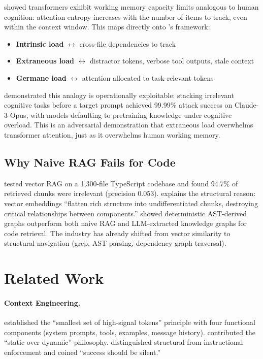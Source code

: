 \documentclass[11pt, a4paper, logo, copyright]{googledeepmind}
\begin{document}
\citet{kim2024working} showed transformers exhibit working memory capacity limits analogous to human cognition: attention entropy increases with the number of items to track, even within the context window. This maps directly onto \citet{sweller1988cognitive}'s framework:

\begin{itemize}[nosep]
    \item \textbf{Intrinsic load} $\leftrightarrow$ cross-file dependencies to track
    \item \textbf{Extraneous load} $\leftrightarrow$ distractor tokens, verbose tool outputs, stale context
    \item \textbf{Germane load} $\leftrightarrow$ attention allocated to task-relevant tokens
\end{itemize}

\citet{guo2024cognitive} demonstrated this analogy is operationally exploitable: stacking irrelevant cognitive tasks before a target prompt achieved 99.99\% attack success on Claude-3-Opus, with models defaulting to pretraining knowledge under cognitive overload. This is an adversarial demonstration that extraneous load overwhelms transformer attention, just as it overwhelms human working memory.

\subsection{Why Naive RAG Fails for Code}

\citet{byterover2025vectorrag} tested vector RAG on a 1,300-file TypeScript codebase and found 94.7\% of retrieved chunks were irrelevant (precision 0.053). \citet{factory2025context} explains the structural reason: vector embeddings ``flatten rich structure into undifferentiated chunks, destroying critical relationships between components.'' \citet{polpichai2026graphrag} showed deterministic AST-derived graphs outperform both naive RAG and LLM-extracted knowledge graphs for code retrieval. The industry has already shifted from vector similarity to structural navigation (grep, AST parsing, dependency graph traversal).


\section{Related Work}
\label{sec:related}

\paragraph{Context Engineering.} \citet{anthropic2025context} established the ``smallest set of high-signal tokens'' principle with four functional components (system prompts, tools, examples, message history). \citet{spotify2025honk} contributed the ``static over dynamic'' philosophy. \citet{humanlayer2025skillissue} distinguished structural from instructional enforcement and coined ``success should be silent.''
\end{document}
